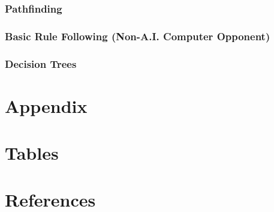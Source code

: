 \documentclass[12pt,a4paper]{report}
\begin{document}
		\subsection{Pathfinding}
		\subsection{Basic Rule Following (Non-A.I. Computer Opponent)}
		\subsection{Decision Trees}

\newpage
\chapter*{Appendix}

\newpage
{}
\listoffigures

\newpage
\chapter*{Tables}

\newpage
\chapter*{References}
	
\end{document}

